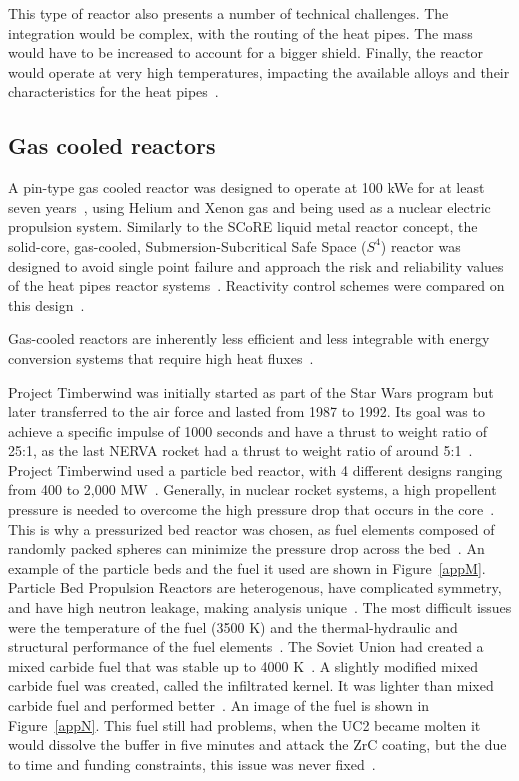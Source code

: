 \documentclass{article}
\begin{document}
This type of reactor also presents a number of technical challenges. The integration would be complex, with the routing of the heat pipes. The mass would have to be increased to account for a bigger shield. Finally, the reactor would operate at very high temperatures, impacting the available alloys and their characteristics for the heat pipes~\cite{el2005score}. 

\subsection{Gas cooled reactors}

A pin-type gas cooled reactor was designed to operate at 100 kWe for at least seven years~\cite{wright2003pin}, using Helium and Xenon gas and being used as a nuclear electric propulsion system. Similarly to the SCoRE liquid metal reactor concept, the solid-core, gas-cooled, Submersion-Subcritical Safe Space ($S^4$) reactor was designed to avoid single point failure and approach the risk and reliability values of the heat pipes reactor systems~\cite{king2006solid,king2009thermal}. Reactivity control schemes were compared on this design~\cite{craft2011reactivity}.

Gas-cooled reactors are inherently less efficient and less integrable with energy conversion systems that require high heat fluxes~\cite{el2002performance,fraas1966comparison,dochat1992free}.

Project Timberwind was initially started as part of the Star Wars program but later transferred to the air force and lasted from 1987 to 1992. Its goal was to achieve a specific impulse of 1000 seconds and have a thrust to weight ratio of 25:1, as the last NERVA rocket had a thrust to weight ratio of around 5:1~\cite{haslett1995space}. Project Timberwind used a particle bed reactor, with 4 different designs ranging from 400 to 2,000 MW~\cite{ludewig1996design}. Generally, in nuclear rocket systems, a high propellent pressure is needed to overcome the high pressure drop that occurs in the core~\cite{ludewig1996design}. This is why a pressurized bed reactor was chosen, as fuel elements composed of randomly packed spheres can minimize the pressure drop across the bed~\cite{ludewig1996design}. An example of the particle beds and the fuel it used are shown in Figure~\ref{appM}. Particle Bed Propulsion Reactors are heterogenous, have complicated symmetry, and have high neutron leakage, making analysis unique~\cite{ludewig1996design}. The most difficult issues were the temperature of the fuel (3500 K) and the thermal-hydraulic and structural performance of the fuel elements~\cite{haslett1995space}. The Soviet Union had created a mixed carbide fuel that was stable up to 4000 K~\cite{haslett1995space}. A slightly modified mixed carbide fuel was created, called the infiltrated kernel. It was lighter than mixed carbide fuel and performed better~\cite{haslett1995space}. An image of the fuel is shown in Figure~\ref{appN}. This fuel still had problems, when the UC2 became molten it would dissolve the buffer in five minutes and attack the ZrC coating, but the due to time and funding constraints, this issue was never fixed~\cite{haslett1995space}.
\end{document}
